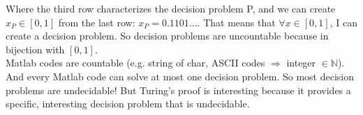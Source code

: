 Where the third row characterizes the decision problem P, and we can create $x_P \in [0,1]$ from the last row: $x_P = 0.1101...$. That means that $\forall x \in [0,1]$, I can create a decision problem. So decision problems are uncountable because in bijection with $[0,1]$.\\

Matlab codes are countable (e.g. string of char, ASCII codes $\Rightarrow$ integer $\in \mathbb{N}$). And every Matlab code can solve at most one decision problem. So most decision problems are undecidable! But Turing's proof is interesting because it provides a specific, interesting decision problem that is undecidable.